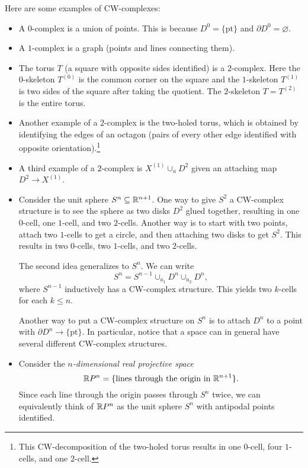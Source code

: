 \begin{example}
  Here are some examples of CW-complexes:
  \begin{itemize}
    \item A $0$-complex is a union of points.
      This is because $D^0 = \{\text{pt}\}$ and
      $\partial D^0 = \varnothing$.
    \item A $1$-complex is a graph (points and lines
      connecting them).
    \item The torus $T$ (a square with opposite sides
      identified) is a $2$-complex. Here
      the $0$-skeleton $T^{(0)}$ is the common corner
      on the square and the $1$-skeleton $T^{(1)}$
      is two sides of the square after taking the
      quotient. The $2$-skeleton $T = T^{(2)}$ is the
      entire torus.
    \item Another example of a $2$-complex is the
      two-holed torus, which is obtained by identifying
      the edges of an octagon (pairs of every other
      edge identified with opposite orientation).\footnote{This CW-decomposition of the two-holed torus results in one $0$-cell,
      four $1$-cells, and one $2$-cell.}
    \item A third example of a $2$-complex is
      $X^{(1)} \cup_a D^2$ given an attaching map
      $D^2 \to X^{(1)}$.
    \item Consider the unit sphere $S^n \subseteq \mathbb{R}^{n + 1}$.
      One way to give $S^2$ a CW-complex structure is
      to see the sphere as two disks $D^2$ glued together,
      resulting in one $0$-cell, one $1$-cell, and two
      $2$-cells. Another way is to start with
      two points, attach two $1$-cells to get a circle,
      and then attaching two disks to get $S^2$. This
      results in two $0$-cells, two $1$-cells, and two
      $2$-cells.

      The second idea generalizes to $S^n$. We can
      write
      \[
        S^n = S^{n - 1} \cup_{a_1} D^n \cup_{a_2} D^n,
      \]
      where $S^{n - 1}$ inductively has a CW-complex
      structure. This yields two $k$-cells for each
      $k \le n$.

      Another way to put a CW-complex structure
      on $S^n$ is to attach $D^n$ to a point with
      $\partial D^n \to \{\text{pt}\}$.
      In particular, notice that a space
      can in general have several different CW-complex
      structures.
    \item Consider the \emph{$n$-dimensional real projective space}
      \[
        \mathbb{R} P^n = \{\text{lines through the origin in } \mathbb{R}^{n + 1}\}.
      \]
      Since each line through the origin passes through
      $S^n$ twice, we can equivalently think of $\mathbb{R} P^n$
      as the unit sphere $S^n$ with antipodal points
      identified.


\end{itemize}
\end{example}
